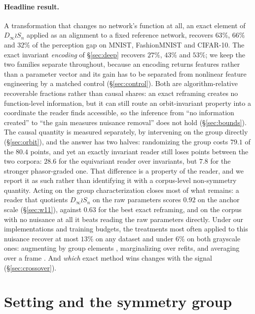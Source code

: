 \documentclass[10pt,twocolumn,letterpaper]{article}
\theoremstyle{definition}
\newcommand{\Dinf}{D_\infty}
\begin{document}
\paragraph{Headline result.} A transformation that changes no network's function at all, an exact
element of $\Dinf \wr S_n$ applied as an alignment to a fixed reference network, recovers $63\%$,
$66\%$ and $32\%$ of the perception gap on MNIST, FashionMNIST and CIFAR-10. The exact
invariant \emph{encoding} of \S\ref{sec:deep} recovers $27\%$, $43\%$ and $53\%$; we keep the two
families separate throughout, because an encoding returns features rather than a parameter vector
and its gain has to be separated from nonlinear feature engineering by a matched control
(\S\ref{sec:control}). Both are algorithm-relative recoverable fractions rather than causal shares:
an exact reframing creates no function-level information, but it can still route an orbit-invariant
property into a coordinate the reader finds accessible, so the inference from ``no information
created'' to ``the gain measures nuisance removal'' does not hold (\S\ref{sec:bounds}). The causal
quantity is measured separately, by intervening on the group directly (\S\ref{sec:orbit}), and the
answer has two halves: randomizing the group costs $79.1$ of the $80.4$ points, and yet an exactly
invariant reader still loses points between the two corpora: $28.6$ for the equivariant reader over
invariants, but $7.8$ for the stronger phasor-graded one. That difference is a property of the
reader, and we report it as such rather than identifying it with a corpus-level non-symmetry
quantity. Acting on the group characterization closes most of what remains: a
reader that quotients $\Dinf \wr S_n$ on the raw parameters scores $0.92$ on the anchor scale
(\S\ref{sec:w11}), against $0.63$ for the best exact reframing, and on the corpus with no nuisance
at all it beats reading the raw parameters directly. Under our
implementations and training budgets, the treatments most often applied to this nuisance recover at
most $13\%$ on any dataset and under $6\%$ on both grayscale ones: augmenting by group elements
\citep{shamsian2024augmentations}, marginalizing over refits, and averaging over a frame
\citep{puny2022frame}. And \emph{which} exact method wins changes with the signal (\S\ref{sec:crossover}).

\section{Setting and the symmetry group}\label{sec:group}
\end{document}
